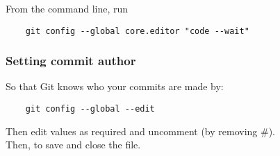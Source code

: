 From the command line, run
\\

\begin{verbatim}
    git config --global core.editor "code --wait"
\end{verbatim}

\subsubsection{Setting commit author}

So that Git knows who your commits are made by:

\begin{verbatim}
    git config --global --edit
\end{verbatim}

Then edit values as required and uncomment (by removing \#).
\\

Then, to save and close the file.
\\